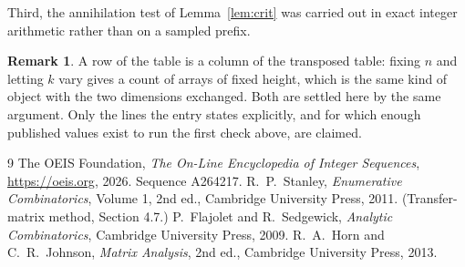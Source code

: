 \documentclass[11pt,a4paper]{article}
\theoremstyle{plain}
\theoremstyle{definition}
\newtheorem{remark}[theorem]{Remark}
\begin{document}
Third, the annihilation test of Lemma~\ref{lem:crit} was carried out in exact integer
arithmetic rather than on a sampled prefix.

\begin{remark}
A row of the table is a column of the transposed table: fixing $n$ and letting $k$ vary gives a
count of arrays of fixed height, which is the same kind of object with the two dimensions
exchanged. Both are settled here by the same argument. Only the lines the entry states
explicitly, and for which enough published values exist to run the first check above, are
claimed.
\end{remark}

\begin{thebibliography}{9}
 The OEIS Foundation, \emph{The On-Line Encyclopedia of Integer
Sequences}, \url{https://oeis.org}, 2026. Sequence A264217.
 R.~P.~Stanley, \emph{Enumerative Combinatorics}, Volume 1, 2nd ed.,
Cambridge University Press, 2011. (Transfer-matrix method, Section 4.7.)
 P.~Flajolet and R.~Sedgewick, \emph{Analytic Combinatorics}, Cambridge
University Press, 2009.
 R.~A.~Horn and C.~R.~Johnson, \emph{Matrix Analysis}, 2nd ed., Cambridge
University Press, 2013.
\end{thebibliography}
\end{document}
